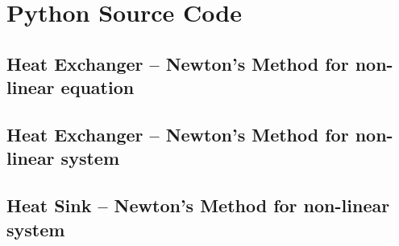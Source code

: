 \documentclass[11pt, a4paper]{article}
\theoremstyle{definition}
\begin{document}
\newpage
\appendix
\section{Python Source Code}
\label{app:code}

\subsection*{Heat Exchanger -- Newton's Method for non-linear equation}


\subsection*{Heat Exchanger -- Newton's Method for non-linear system}


\subsection*{Heat Sink -- Newton's Method for non-linear system}

\end{document}
